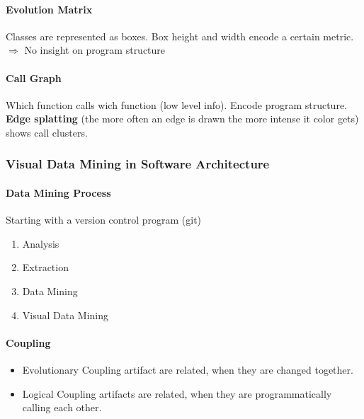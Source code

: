 \documentclass[10pt,a4paper]{article}
\begin{document}
		\paragraph{Evolution Matrix} Classes are represented as boxes. Box height and width encode a certain metric. $ \Rightarrow $ No insight on program structure
		
		\paragraph{Call Graph} Which function calls wich function (low level info). Encode program structure. \textbf{Edge splatting} (the more often an edge is drawn the more intense it color gets) shows call clusters.
		
	\subsubsection{Visual Data Mining in Software Architecture}
		\paragraph{Data Mining Process}
		Starting with a version control program (git)
		\begin{enumerate}
			\item Analysis
			\item Extraction
			\item Data Mining
			\item Visual Data Mining
		\end{enumerate} 
		
		
		\paragraph{Coupling}
		\begin{itemize}
			\item Evolutionary Coupling artifact are related, when they are changed together.
			\item Logical Coupling artifacts are related, when they are programmatically calling each other.
		\end{itemize}
			
\end{document}
